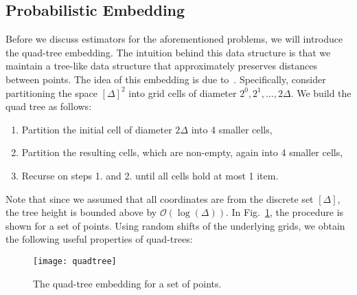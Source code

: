 \documentclass[11pt]{article}
\renewcommand{\O}{\mathcal{O}}
\begin{document}
\subsection{Probabilistic Embedding}
Before we discuss estimators for the aforementioned problems, we will introduce the quad-tree embedding. The intuition behind this data structure is that we maintain a tree-like data structure that approximately preserves distances between points. The idea of this embedding is due to~\cite{bartal96}.
Specifically, consider partitioning the space $[\Delta]^2$ into grid cells of diameter $2^0, 2^1, \ldots, 2\Delta$. We build the quad tree as follows: 
\begin{enumerate}
	\item 
	Partition the initial cell of diameter $2\Delta$ into 4 smaller cells,
	\item 
	Partition the resulting cells, which are non-empty, again into 4 smaller cells,
	\item 
	Recurse on steps 1. and 2. until all cells hold at most 1 item.
\end{enumerate}
Note that since we assumed that all coordinates are from the discrete set $[\Delta]$, the tree height is bounded above by $\O(\log(\Delta))$. In Fig.~\ref{fig:quadtree}, the procedure is shown for a set of points. Using random shifts of the underlying grids, we obtain the following useful properties of quad-trees:

\begin{figure}
	\centering
	\texttt{[image: quadtree]}
	\caption{The quad-tree embedding for a set of points.}
	\label{fig:quadtree}
\end{figure}
\end{document}
